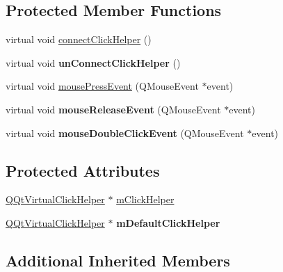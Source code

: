 \subsection*{Protected Member Functions}
\begin{DoxyCompactItemize}
\item 
virtual void \mbox{\hyperlink{class_q_qt_virtual_click_dialog_a93e958d50ddc3fb38ca0e4905673cf74}{connect\+Click\+Helper}} ()
\item 
\mbox{\label{class_q_qt_virtual_click_dialog_a7a295dbef71f3edebe61bd7218fcb6fc}} 
virtual void {\bfseries un\+Connect\+Click\+Helper} ()
\item 
virtual void \mbox{\hyperlink{class_q_qt_virtual_click_dialog_a8e8f31f3a7c00970f5b2feb60073eb83}{mouse\+Press\+Event}} (Q\+Mouse\+Event $\ast$event)
\item 
\mbox{\label{class_q_qt_virtual_click_dialog_a63a9ec030a1473a569a07c670b352672}} 
virtual void {\bfseries mouse\+Release\+Event} (Q\+Mouse\+Event $\ast$event)
\item 
\mbox{\label{class_q_qt_virtual_click_dialog_ac5c78562e16d7a92cf0ef89ab51b2d6e}} 
virtual void {\bfseries mouse\+Double\+Click\+Event} (Q\+Mouse\+Event $\ast$event)
\end{DoxyCompactItemize}
\subsection*{Protected Attributes}
\begin{DoxyCompactItemize}
\item 
\mbox{\hyperlink{class_q_qt_virtual_click_helper}{Q\+Qt\+Virtual\+Click\+Helper}} $\ast$ \mbox{\hyperlink{class_q_qt_virtual_click_dialog_afdf66e13b821224b34c0a4b68c5c0564}{m\+Click\+Helper}}
\item 
\mbox{\label{class_q_qt_virtual_click_dialog_ab0e635fb9e984df11323676a1ce3fd35}} 
\mbox{\hyperlink{class_q_qt_virtual_click_helper}{Q\+Qt\+Virtual\+Click\+Helper}} $\ast$ {\bfseries m\+Default\+Click\+Helper}
\end{DoxyCompactItemize}
\subsection*{Additional Inherited Members}


